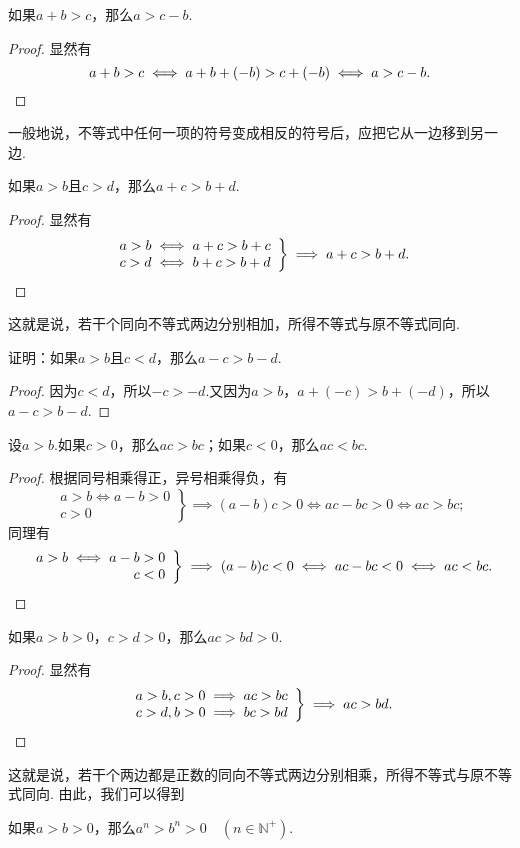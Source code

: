 \begin{corollary}
如果\(a+b>c\)，那么\(a>c-b\).
\begin{proof}
显然有\[
a+b>c
\iff a+b+(-b)>c+(-b)
\iff a>c-b.
\qedhere
\]
\end{proof}
\end{corollary}
一般地说，不等式中任何一项的符号变成相反的符号后，应把它从一边移到另一边.

\begin{corollary}
如果\(a>b\)且\(c>d\)，那么\(a+c>b+d\).
\begin{proof}
显然有\[
\left. \begin{array}{c}
a>b \iff a+c>b+c \\
c>d \iff b+c>b+d
\end{array} \right\}
\implies a+c>b+d.
\qedhere
\]
\end{proof}
\end{corollary}
这就是说，若干个同向不等式两边分别相加，所得不等式与原不等式同向.

\begin{example}
证明：如果\(a > b\)且\(c < d\)，那么\(a - c > b - d\).
\begin{proof}
因为\(c < d\)，所以\(-c > -d\).又因为\(a > b\)，\(a + (-c) > b + (-d)\)，所以\(a - c > b - d\).
\end{proof}
\end{example}

\begin{theorem}
设\(a>b\).如果\(c>0\)，那么\(ac>bc\)；如果\(c<0\)，那么\(ac<bc\).
\begin{proof}
根据同号相乘得正，异号相乘得负，有\[
\left. \begin{array}{r}
a>b \iff a-b>0 \\
c>0
\end{array} \right\}
\implies (a-b)c>0
\iff ac-bc>0
\iff ac>bc;
\]同理有\[
\left. \begin{array}{r}
a>b \iff a-b> 0 \\
c<0
\end{array} \right\}
\implies (a-b)c<0
\iff ac-bc<0
\iff ac<bc.
\qedhere
\]
\end{proof}
\end{theorem}

\begin{corollary}
如果\(a>b>0\)，\(c>d>0\)，那么\(ac>bd>0\).
\begin{proof}
显然有\[
\left. \begin{array}{r}
a>b,c>0 \implies ac>bc \\
c>d,b>0 \implies bc>bd
\end{array} \right\}
\implies ac>bd.
\qedhere
\]
\end{proof}
\end{corollary}
这就是说，若干个两边都是正数的同向不等式两边分别相乘，所得不等式与原不等式同向.
由此，我们可以得到
\begin{corollary}
如果\(a>b>0\)，那么\(a^n>b^n>0 \quad (n\in\mathbb{N}^+)\).
\end{corollary}

